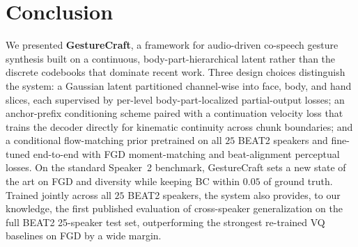 \section{Conclusion}
\label{sec:conclusion}
We presented \textbf{GestureCraft}, a framework for audio-driven co-speech gesture synthesis built on a continuous, body-part-hierarchical latent rather than the discrete codebooks that dominate recent work.
Three design choices distinguish the system: a Gaussian latent partitioned channel-wise into face, body, and hand slices, each supervised by per-level body-part-localized partial-output losses; an anchor-prefix conditioning scheme paired with a continuation velocity loss that trains the decoder directly for kinematic continuity across chunk boundaries; and a conditional flow-matching prior pretrained on all $25$ BEAT2 speakers and fine-tuned end-to-end with FGD moment-matching and beat-alignment perceptual losses.
On the standard Speaker~2 benchmark, GestureCraft sets a new state of the art on FGD and diversity while keeping BC within $0.05$ of ground truth.
Trained jointly across all $25$ BEAT2 speakers, the system also provides, to our knowledge, the first published evaluation of cross-speaker generalization on the full BEAT2 25-speaker test set, outperforming the strongest re-trained VQ baselines on FGD by a wide margin.


